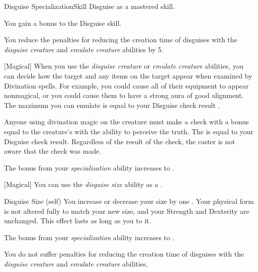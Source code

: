     \begin{feat}{Disguise Specialization}{Skill}
        \featpre Disguise as a mastered skill.

         You gain a  bonus to the Disguise skill.

         You reduce the penalties for reducing the creation time of disguises with the \textit{disguise creature} and \textit{emulate creature} abilities by 5.

        [Magical] When you use the \textit{disguise creature} or \textit{emulate creature} abilities, you can decide how the target and any items on the target appear when examined by Divination spells.
        For example, you could cause all of their equipment to appear nonmagical, or you could cause them to have a strong aura of good alignment.
        The maximum  you can emulate is equal to your Disguise check result .

        Anyone using divination magic on the creature must make a check with a bonus equal to the creature's  with the ability to perceive the truth.
        The  is equal to your Disguise check result.
        Regardless of the result of the check, the caster is not aware that the check was made.

         The bonus from your \textit{specialization} ability increases to .

        [Magical] You can use the \textit{disguise size} ability as a .
        \begin{attuneability}{Disguise Size}
             (self)
            \rankline
            You increase or decrease your size by one .
            Your physical form is not altered fully to match your new size, and your Strength and Dexterity are unchanged.
            This effect lasts as long as you  to it.
        \end{attuneability}

         The bonus from your \textit{specialization} ability increases to .

         You do not suffer penalties for reducing the creation time of disguises with the \textit{disguise creature} and \textit{emulate creature} abilities.
    \end{feat}

